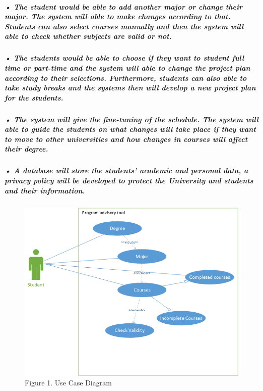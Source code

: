 \documentclass[12pt]{article}
\begin{document}
\subparagraph{•	The student would be able to add another major or change their major. The system will able to make changes according to that. Students can also select courses manually and then the system will able to check whether subjects are valid or not.}

\subparagraph{•	The students would be able to choose if they want to student full time or part-time and the system will able to change the project plan according to their selections. Furthermore, students can also able to take study breaks and the systems then will develop a new project plan for the students.}

\subparagraph{•	The system will give the fine-tuning of the schedule. The system will able to guide the students on what changes will take place if they want to move to other universities and how changes in courses will affect their degree.}

\subparagraph{•	A database will store the students’ academic and personal data, a privacy policy will be developed to protect the University and students and their information.}


\begin{figure}[]
\centering
\includegraphics[width = 14cm]{Aims.png}
Figure 1. Use Case Diagram
\end{figure}
\end{document}
